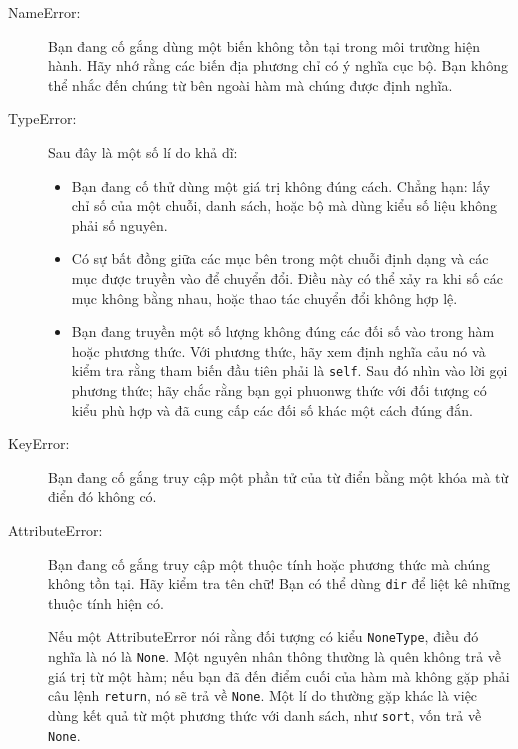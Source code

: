\documentclass[11pt]{book}
\begin{document}
\begin{description}

\item[NameError:] Bạn đang cố gắng dùng một biến không tồn tại trong
môi trường hiện hành. Hãy nhớ rằng các biến địa phương chỉ có ý nghĩa
cục bộ. Bạn không thể nhắc đến chúng từ bên ngoài hàm mà chúng được
định nghĩa.


\item[TypeError:] Sau đây là một số lí do khả dĩ:

\begin{itemize}

\item  Bạn đang cố thử dùng một giá trị không đúng cách.  Chẳng hạn: 
lấy chỉ số của một chuỗi, danh sách, hoặc bộ mà dùng kiểu số liệu
không phải số nguyên.


\item Có sự bất đồng giữa các mục bên trong một chuỗi định dạng và
các mục được truyền vào để chuyển đổi. Điều này có thể xảy ra khi
số các mục không bằng nhau, hoặc thao tác chuyển đổi không hợp lệ.


\item Bạn đang truyền một số lượng không đúng các đối số vào trong hàm
hoặc phương thức. Với phương thức, hãy xem định nghĩa cảu nó
và kiểm tra rằng tham biến đầu tiên phải là {\tt self}.  Sau đó nhìn vào
lời gọi phương thức; hãy chắc rằng bạn gọi phuonwg thức với đối tượng
có kiểu phù hợp và đã cung cấp các đối số khác một cách đúng đắn.

\end{itemize}

\item[KeyError:] Bạn đang cố gắng truy cập một phần tử của từ điển bằng một
khóa mà từ điển đó không có.


\item[AttributeError:] Bạn đang cố gắng truy cập một thuộc tính hoặc 
phương thức mà chúng không tồn tại. Hãy kiểm tra tên chữ! Bạn có thể dùng
{\tt dir} để liệt kê những thuộc tính hiện có.

Nếu một AttributeError nói rằng đối tượng có kiểu {\tt NoneType},
điều đó nghĩa là nó là {\tt None}.  Một nguyên nhân thông thường là quên
không trả về giá trị từ một hàm; nếu bạn đã đến điểm cuối của hàm
mà không gặp phải câu lệnh {\tt return}, nó sẽ trả về
{\tt None}. Một lí do thường gặp khác là việc dùng kết quả từ
một phương thức với danh sách, như {\tt sort}, vốn trả về {\tt None}.


\end{description}
\end{document}
